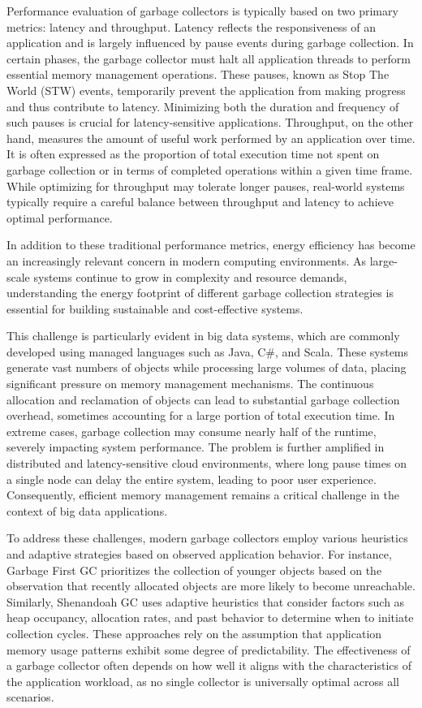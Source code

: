 Performance evaluation of garbage collectors is typically based on two primary metrics: latency and throughput. Latency reflects the responsiveness of an application and is largely influenced by pause events during garbage collection. In certain phases, the garbage collector must halt all application threads to perform essential memory management operations. These pauses, known as Stop The World (STW) events, temporarily prevent the application from making progress and thus contribute to latency. Minimizing both the duration and frequency of such pauses is crucial for latency-sensitive applications. Throughput, on the other hand, measures the amount of useful work performed by an application over time. It is often expressed as the proportion of total execution time not spent on garbage collection or in terms of completed operations within a given time frame. While optimizing for throughput may tolerate longer pauses, real-world systems typically require a careful balance between throughput and latency to achieve optimal performance.

In addition to these traditional performance metrics, energy efficiency has become an increasingly relevant concern in modern computing environments. As large-scale systems continue to grow in complexity and resource demands, understanding the energy footprint of different garbage collection strategies is essential for building sustainable and cost-effective systems.

This challenge is particularly evident in big data systems, which are commonly developed using managed languages such as Java, C\#, and Scala. These systems generate vast numbers of objects while processing large volumes of data, placing significant pressure on memory management mechanisms. The continuous allocation and reclamation of objects can lead to substantial garbage collection overhead, sometimes accounting for a large portion of total execution time. In extreme cases, garbage collection may consume nearly half of the runtime, severely impacting system performance. The problem is further amplified in distributed and latency-sensitive cloud environments, where long pause times on a single node can delay the entire system, leading to poor user experience. Consequently, efficient memory management remains a critical challenge in the context of big data applications.

To address these challenges, modern garbage collectors employ various heuristics and adaptive strategies based on observed application behavior. For instance, Garbage First GC prioritizes the collection of younger objects based on the observation that recently allocated objects are more likely to become unreachable. Similarly, Shenandoah GC uses adaptive heuristics that consider factors such as heap occupancy, allocation rates, and past behavior to determine when to initiate collection cycles. These approaches rely on the assumption that application memory usage patterns exhibit some degree of predictability. The effectiveness of a garbage collector often depends on how well it aligns with the characteristics of the application workload, as no single collector is universally optimal across all scenarios.

